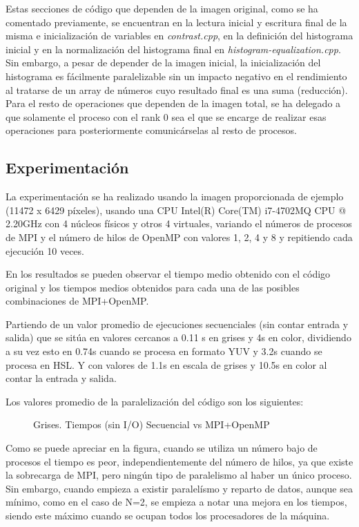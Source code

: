 \documentclass[12pt]{report} %
\begin{document}
Estas secciones de código que dependen de la imagen original, como se ha comentado previamente, se encuentran
en la lectura inicial y escritura final de la misma e inicialización de variables en \textit{contrast.cpp},
en la definición del histograma inicial y en la normalización del histograma final en
\textit{histogram-equalization.cpp}. Sin embargo, a pesar de depender de la imagen inicial,
la inicialización del histograma es fácilmente paralelizable sin
un impacto negativo en el rendimiento al tratarse de un array de números cuyo resultado final es una suma (reducción).
Para el resto de operaciones que dependen de la imagen total, se ha delegado a que solamente el proceso
con el rank 0 sea el que se encarge de realizar esas operaciones para posteriormente comunicárselas al
resto de procesos.

\subsection{Experimentación}

La experimentación se ha realizado usando la imagen proporcionada de ejemplo (11472 x 6429 píxeles),
usando una CPU Intel(R) Core(TM) i7-4702MQ CPU @ 2.20GHz con 4 núcleos físicos y otros 4 virtuales, variando
el números de procesos de MPI y el número de hilos de OpenMP con valores 1, 2, 4 y 8 y repitiendo cada ejecución 10 veces.

En los resultados se pueden observar el tiempo medio obtenido con el código original
y los tiempos medios obtenidos para cada una de las posibles combinaciones de MPI+OpenMP.

Partiendo de un valor promedio de ejecuciones secuenciales (sin contar entrada y salida) que se sitúa en
valores cercanos a 0.11 s en grises y 4s en color, dividiendo a su vez esto en 0.74s cuando se procesa
en formato YUV y 3.2s cuando se procesa en HSL. Y con valores de 1.1s en escala de grises y 10.5s en color al contar la entrada y salida.

Los valores promedio de la paralelización del código son los siguientes:

\begin{figure}[H]
    \makebox[\textwidth][c]{
        
    }
    \caption{Grises. Tiempos (sin I/O) Secuencial vs MPI+OpenMP}
    \label{fig:tiempos_no_io_gris}
\end{figure}

Como se puede apreciar en la figura, cuando se utiliza un número bajo de procesos el tiempo es
peor, independientemente del número de hilos, ya que existe la sobrecarga de MPI, pero ningún tipo de paralelismo
al haber un único proceso.
Sin embargo, cuando empieza a existir paralelísmo y reparto de datos, aunque sea mínimo, como en el caso de N=2,
se empieza a notar una mejora en los tiempos, siendo este máximo cuando se ocupan todos los procesadores de
la máquina.
\end{document}
